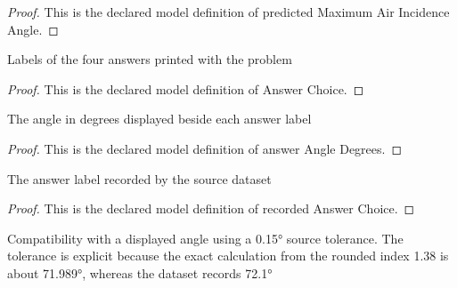 \begin{proof}
  This is the declared model definition of predicted Maximum Air Incidence Angle.
\end{proof}
\begin{definition}
  \label{def:physics:phyx-mini-0096:phyxminiproblems-problemphyxmini0096-answerchoice}
  Labels of the four answers printed with the problem
\end{definition}
\begin{proof}
  This is the declared model definition of Answer Choice.
\end{proof}
\begin{definition}
  \label{def:physics:phyx-mini-0096:phyxminiproblems-problemphyxmini0096-answerangledegrees}
  The angle in degrees displayed beside each answer label
\end{definition}
\begin{proof}
  This is the declared model definition of answer Angle Degrees.
\end{proof}
\begin{definition}
  \label{def:physics:phyx-mini-0096:phyxminiproblems-problemphyxmini0096-recordedanswerchoice}
  The answer label recorded by the source dataset
\end{definition}
\begin{proof}
  This is the declared model definition of recorded Answer Choice.
\end{proof}
\begin{definition}
  \label{def:physics:phyx-mini-0096:phyxminiproblems-problemphyxmini0096-matchesdisplayedanglewithinsourcetolerance}
  Compatibility with a displayed angle using a 0.15° source tolerance. The tolerance is explicit because the exact calculation from the rounded index 1.38 is about 71.989°, whereas the dataset records 72.1°
\end{definition}
